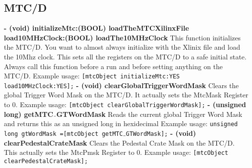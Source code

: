 \documentclass[12pt,preprint]{article}
\begin{document}
\subsection{MTC/D}
\textbf{ - (void) initializeMtc:(BOOL) loadTheMTCXilinxFile load10MHzClock:(BOOL) loadThe10MHzClock}
\newline\newline
This function initializes the MTC/D. You want to almost always initialize with the Xlinix file and load the 10Mhz clock. This sets all the registers on the MTC/D to a safe initial state. Always call this function before a run and before setting anything on the MTC/D. 
\newline\newline 
Example usage:\newline
\texttt{[mtcObject initializeMtc:YES  load10MHzClock:YES];}
\newline\newline
\textbf{- (void) clearGlobalTriggerWordMask}
\newline\newline
Clears the global Trigger Word Mask on the MTC/D. It actually sets the MtcMask Register to 0. 
\newline\newline
Example usage:\newline
\texttt{[mtcObject clearGlobalTriggerWordMask];}
\newline\newline
\textbf{- (unsigned long) getMTC$\mathunderscore$GTWordMask}
\newline\newline
Reads the current global Trigger Word Mask and returns this as an unsigned long in hexidecimal\newline\newline
Example usage:\newline
\texttt{unsigned long gtWordMask  =[mtcObject getMTC$\mathunderscore$GTWordMask];}
\newline\newline
\textbf{- (void) clearPedestalCrateMask}
\newline\newline
Clears the Pedestal Crate Mask on the MTC/D. This actually sets the MtcPmsk Register to 0. 
\newline\newline
Example usage:\newline
\texttt{[mtcObject clearPedestalCrateMask];}
\newline\newline
\end{document}
